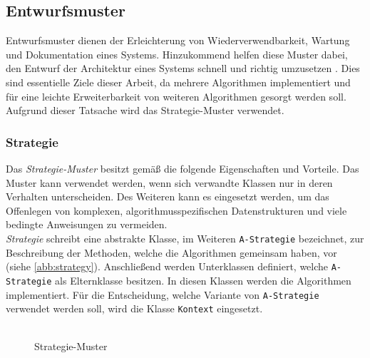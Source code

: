 \documentclass[12pt,a4paper,bibliography=totocnumbered,listof=totocnumbered]{article}
\begin{document}
\subsection{Entwurfsmuster}
Entwurfsmuster dienen der Erleichterung von Wiederverwendbarkeit, Wartung und Dokumentation eines Systems. Hinzukommend helfen diese Muster dabei, den Entwurf der Architektur eines Systems schnell und richtig umzusetzen \citep[S. 1 f.]{gamma.2011}. Dies sind essentielle Ziele dieser Arbeit, da mehrere Algorithmen implementiert und für eine leichte Erweiterbarkeit von weiteren Algorithmen gesorgt werden soll. Aufgrund dieser Tatsache wird das Strategie-Muster verwendet. 

\subsubsection{Strategie}
Das \emph{Strategie-Muster} besitzt gemäß \citep[S. 315 ff.]{gamma.2011} die folgende Eigenschaften und Vorteile.
Das Muster kann verwendet werden, wenn sich verwandte Klassen nur in deren Verhalten unterscheiden. Des Weiteren kann es eingesetzt werden, um das Offenlegen von komplexen, algorithmusspezifischen Datenstrukturen und viele bedingte Anweisungen zu vermeiden.\\
\textit{Strategie} schreibt eine abstrakte Klasse, im Weiteren \texttt{A-Strategie} bezeichnet, zur Beschreibung der Methoden, welche die Algorithmen gemeinsam haben, vor (siehe \autoref{abb:strategy}). Anschließend werden Unterklassen definiert, welche \texttt{A-Strategie} als Elternklasse besitzen. In diesen Klassen werden die Algorithmen implementiert. Für die Entscheidung, welche Variante von \texttt{A-Strategie} verwendet werden soll, wird die Klasse \texttt{Kontext} eingesetzt.\\\\ 
\begin{figure}[h]
\centering
{}
\caption{Strategie-Muster \citep{Goll.2014}}
\label{abb:strategy}
\end{figure}
\end{document}
